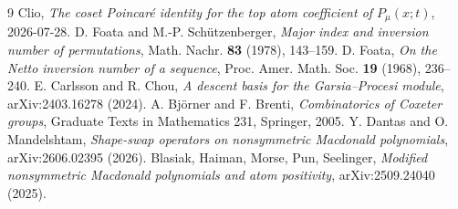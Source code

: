 \documentclass[11pt]{article}
\theoremstyle{definition}
\begin{document}
\begin{thebibliography}{9}
  Clio, \emph{The coset Poincar\'e identity for the top atom coefficient of
  $P_\mu(x;t)$}, 2026-07-28.
  D. Foata and M.-P. Sch\"utzenberger, \emph{Major index and inversion number
  of permutations}, Math. Nachr. \textbf{83} (1978), 143--159.
  D. Foata, \emph{On the Netto inversion number of a sequence}, Proc. Amer.
  Math. Soc. \textbf{19} (1968), 236--240.
  E. Carlsson and R. Chou, \emph{A descent basis for the Garsia--Procesi
  module}, arXiv:2403.16278 (2024).
  A. Bj\"orner and F. Brenti, \emph{Combinatorics of Coxeter groups}, Graduate
  Texts in Mathematics 231, Springer, 2005.
  Y. Dantas and O. Mandelshtam, \emph{Shape-swap operators on nonsymmetric
  Macdonald polynomials}, arXiv:2606.02395 (2026).
  Blasiak, Haiman, Morse, Pun, Seelinger, \emph{Modified nonsymmetric
  Macdonald polynomials and atom positivity}, arXiv:2509.24040 (2025).
\end{thebibliography}
\end{document}
